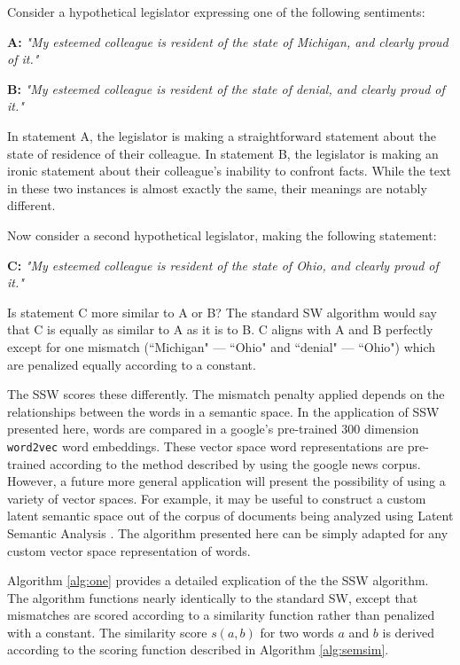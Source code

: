 \documentclass[11pt]{article}
\begin{document}
\begin{flushleft}
Consider a hypothetical legislator expressing  one of the following sentiments:

\textbf{A:} \emph{"My esteemed colleague is resident of the state of Michigan, and clearly proud of it."}
 
\textbf{B:} \emph{"My esteemed colleague is resident of the state of denial, and clearly proud of it."}
 
In statement A, the legislator is making a straightforward statement about the state of residence of their colleague. In statement B, the legislator is making an ironic statement about their colleague's inability to confront facts. While the text in these two instances is almost exactly the same, their meanings are notably different. 

Now consider a second hypothetical legislator, making the following statement: 

\textbf{C:} \emph{"My esteemed colleague is resident of the state of Ohio, and clearly proud of it."}

Is statement C more similar to A or B? The standard SW algorithm would say that C is equally as similar to A as it is to B. C aligns with A and B perfectly except for one mismatch (``Michigan" --- ``Ohio" and ``denial" --- ``Ohio") which are penalized equally according to a constant.

The SSW scores these differently. The mismatch penalty applied depends on the relationships between the words in a semantic space. In the application of SSW presented here, words are compared in a google's pre-trained 300 dimension \texttt{word2vec} word embeddings. These vector space word representations are pre-trained according to the method described by \cite{mikolov2013efficient} using the google news corpus. However, a future more general application will present the possibility of using a variety of vector spaces. For example, it may be useful to construct a custom latent semantic space out of the corpus of documents being analyzed using Latent Semantic Analysis \citep{furnas1988information, deerwester1990indexing}. The algorithm presented here can be simply adapted for any custom vector space representation of words.

Algorithm \ref{alg:one} provides a detailed explication of the the SSW algorithm. The algorithm functions nearly identically to the standard SW, except that mismatches are scored according to a similarity function rather than penalized with a constant. The similarity score $s(a,b)$ for two words $a$ and $b$ is derived according to the scoring function described in Algorithm \ref{alg:semsim}.


\end{flushleft}
\end{document}
